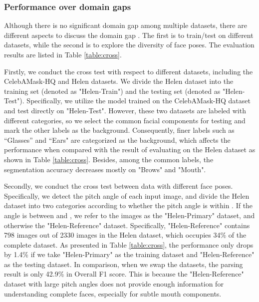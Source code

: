 \subsubsection{Performance over domain gaps}
Although there is no significant domain gap among multiple datasets, there are different aspects to discuss the domain gap \cite{luo2021category,luo2019significance}. The first is to train/test on different datasets, while the second is to explore the diversity of face poses. The evaluation results are listed in Table \ref{table:cross}.

Firstly, we conduct the cross test with respect to different datasets, including the CelebAMask-HQ and Helen datasets. 
We divide the Helen dataset into the training set (denoted as "Helen-Train") and the testing set (denoted as "Helen-Test"). 
Specifically, we utilize the model trained on the CelebAMask-HQ dataset and test directly on "Helen-Test". However, these two datasets are labeled with different categories, so we select the common facial components for testing and mark the other labels as the background. 
Consequently, finer labels such as ``Glasses” and ``Ears" are categorized as the background, which affects the performance when compared with the result of evaluating on the Helen dataset as shown in Table \ref{table:cross}. 
Besides, among the common labels, the segmentation accuracy decreases mostly on "Brows" and "Mouth".

{Secondly, we conduct the cross test between data with different face poses. 
Specifically, we detect the pitch angle of each input image, and divide the Helen dataset into two categories according to whether the pitch angle is within . If the angle is between  and , we refer to the images as the "Helen-Primary" dataset, and otherwise the "Helen-Reference" dataset. 
Specifically, "Helen-Reference" contains 798 images out of 2330 images in the Helen dataset, which occupies 34\% of the complete dataset. 
As presented in Table \ref{table:cross}, the performance only drops by 1.4\% if we take "Helen-Primary" as the training dataset and "Helen-Reference" as the testing dataset. 
In comparison, when we swap the datasets, the parsing result is only 42.9\% in Overall F1 score. This is because the "Helen-Reference" dataset with large pitch angles does not provide enough information for understanding complete faces, especially for subtle mouth components.}

